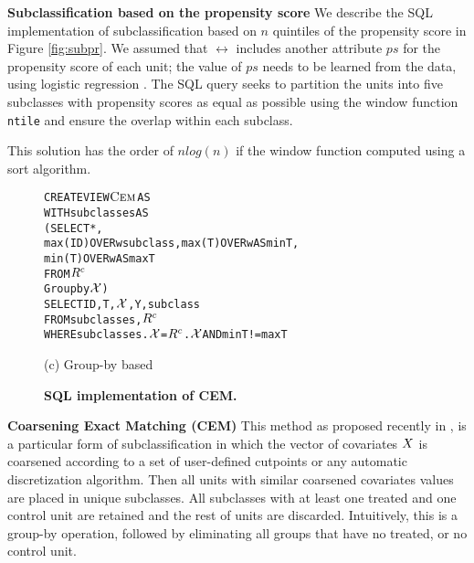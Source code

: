 {\bf Subclassification based on the propensity score} We describe the
SQL implementation of subclassification based on $n$ quintiles of the
propensity score in Figure \ref{fig:subpr}.  We assumed that $\rel$
includes another attribute $ps$ for the propensity score of each unit;
the value of $ps$ needs to be learned from the data, using logistic
regression \cite{Rubin1983b}.  The SQL query seeks to partition
the units into five subclasses with propensity scores as equal as
possible using the window function {\verb|ntile|} and ensure the overlap within each subclass.  This solution has the order of $nlog(n)$ if the window
function computed using a sort algorithm.







\begin{figure}
\begin{alltt} \scriptsize
CREATE VIEW \(\cem\) AS
WITH subclasses AS
  (SELECT *,
          max(ID) OVER w subclass, max(T) OVER w AS minT,
          min(T) OVER w AS maxT
   FROM \(\crele\)
   Group by \(\ccv\))
SELECT ID, T, \(\ccv\), Y, subclass
FROM subclasses,\(\crele\)
WHERE subclasses.\(\ccv\)=\(\crele\).\(\ccv\)  AND  minT!=maxT

\end{alltt}\vspace{-.2cm}\hspace{2.5cm}
(c) Group-by based
\vspace{-.1cm}
  \caption{\bf{SQL implementation of CEM.}}\label{fig:cem}
\end{figure}



{\bf Coarsening Exact Matching (CEM)} This method as proposed
recently in \cite{IacKinPor09},  is a particular form of subclassification in which the vector of covariates ${{X}}$ is
coarsened according to a set of user-defined cutpoints or any
automatic discretization algorithm.  Then all units with similar
coarsened covariates values are placed in unique subclasses. All
subclasses with at least one treated and one control unit are retained
and the rest of units are discarded.  Intuitively, this is a group-by
operation, followed by eliminating all groups that have no treated, or
no control unit. 

